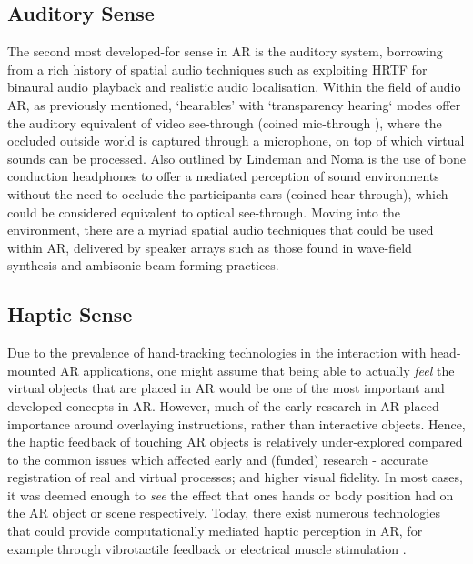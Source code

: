 \subsection{Auditory Sense}\label{sec: ar-sensory-auditory}
The second most developed-for sense in AR is the auditory system, borrowing from a rich history of spatial audio techniques such as exploiting HRTF for binaural audio playback and realistic audio localisation. Within the field of audio AR, as previously mentioned, `hearables' with `transparency hearing` modes offer the auditory equivalent of video see-through (coined mic-through \citep{lindeman2008}), where the occluded outside world is captured through a microphone, on top of which virtual sounds can be processed. Also outlined by Lindeman and Noma is the use of bone conduction headphones to offer a mediated perception of sound environments without the need to occlude the participants ears (coined hear-through), which could be considered equivalent to optical see-through. Moving into the environment, there are a myriad spatial audio techniques that could be used within AR, delivered by speaker arrays such as those found in wave-field synthesis and ambisonic beam-forming practices.

\subsection{Haptic Sense}\label{sec: ar-sensory-haptic}
Due to the prevalence of hand-tracking technologies in the interaction with head-mounted AR applications, one might assume that being able to actually \textit{feel} the virtual objects that are placed in AR would be one of the most important and developed concepts in AR. However, much of the early research in AR placed importance around overlaying instructions, rather than interactive objects. Hence, the haptic feedback of touching AR objects is relatively under-explored compared to the common issues which affected early and (funded) research - accurate registration of real and virtual processes; and higher visual fidelity. In most cases, it was deemed enough to \textit{see} the effect that ones hands or body position had on the AR object or scene respectively. Today, there exist numerous technologies that could provide computationally mediated haptic perception in AR, for example through vibrotactile feedback or electrical muscle stimulation \citep{lopes2018}.

